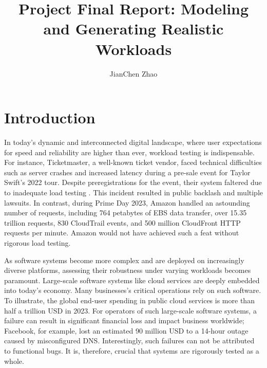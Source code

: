 

\title{Project Final Report: Modeling and Generating Realistic Workloads}
\author{JianChen Zhao}




\begin{abstract}
\end{abstract}

\maketitle

\section{Introduction}

In today's dynamic and interconnected digital landscape, where user expectations for speed and reliability are higher than ever, workload testing is indispensable. For instance, Ticketmaster, a well-known ticket vendor, faced technical difficulties such as server crashes and increased latency during a pre-sale event for Taylor Swift's 2022 tour. Despite preregistrations for the event, their system faltered due to inadequate load testing \cite{Reuters2022-dc}. This incident resulted in public backlash and multiple lawsuits. In contrast, during Prime Day 2023, Amazon handled an astounding number of requests, including 764 petabytes of EBS data transfer, over 15.35 trillion requests, 830 CloudTrail events, and 500 million CloudFront HTTP requests per minute. Amazon would not have achieved such a feat without rigorous load testing\cite{Barr2023-wr}.

As software systems become more complex and are deployed on increasingly diverse platforms, assessing their robustness under varying workloads becomes paramount. Large-scale software systems like cloud services are deeply embedded into today's economy. Many businesses's critical operations rely on such software. To illustrate, the global end-user spending in public cloud services is more than half a trillion USD in 2023\cite{UnknownUnknown-aj}. For operators of such large-scale software systems, a failure can result in significant financial loss and impact business worldwide\cite{LuuUnknown-mo}; Facebook, for example, lost an estimated 90 million USD to a 14-hour outage caused by misconfigured DNS\cite{AtlassianUnknown-sw}. Interestingly, such failures can not be attributed to functional bugs\cite{Weyuker2000-gw}. It is, therefore, crucial that systems are rigorously tested as a whole.

